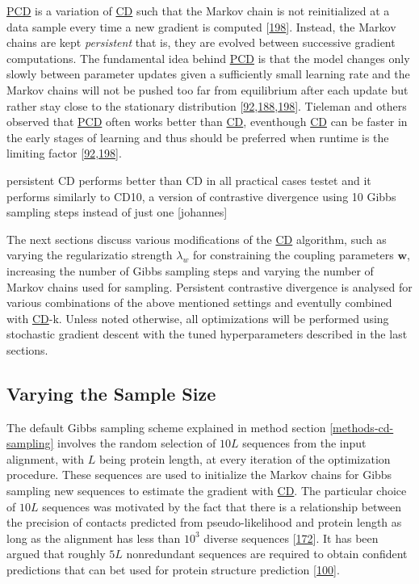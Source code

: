 \documentclass[11pt,a4paper,twoside]{book}
\newcommand{\w}{\mathbf{w}}
\theoremstyle{definition}
\theoremstyle{definition}
\theoremstyle{remark}
\begin{document}
\protect\hyperlink{abbrev}{PCD} is a variation of
\protect\hyperlink{abbrev}{CD} such that the Markov chain is not
reinitialized at a data sample every time a new gradient is computed
{[}\protect\hyperlink{ref-Tieleman2008}{198}{]}. Instead, the Markov
chains are kept \emph{persistent} that is, they are evolved between
successive gradient computations. The fundamental idea behind
\protect\hyperlink{abbrev}{PCD} is that the model changes only slowly
between parameter updates given a sufficiently small learning rate and
the Markov chains will not be pushed too far from equilibrium after each
update but rather stay close to the stationary distribution
{[}\protect\hyperlink{ref-Murphy2012}{92},\protect\hyperlink{ref-Fischer2012}{188},\protect\hyperlink{ref-Tieleman2008}{198}{]}.
Tieleman and others observed that \protect\hyperlink{abbrev}{PCD} often
works better than \protect\hyperlink{abbrev}{CD}, eventhough
\protect\hyperlink{abbrev}{CD} can be faster in the early stages of
learning and thus should be preferred when runtime is the limiting
factor
{[}\protect\hyperlink{ref-Murphy2012}{92},\protect\hyperlink{ref-Tieleman2008}{198}{]}.

persistent CD performs better than CD in all practical cases testet and
it performs similarly to CD10, a version of contrastive divergence using
10 Gibbs sampling steps instead of just one {[}johannes{]}

The next sections discuss various modifications of the
\protect\hyperlink{abbrev}{CD} algorithm, such as varying the
regularizatio strength \(\lambda_w\) for constraining the coupling
parameters \(\w\), increasing the number of Gibbs sampling steps and
varying the number of Markov chains used for sampling. Persistent
contrastive divergence is analysed for various combinations of the above
mentioned settings and eventully combined with
\protect\hyperlink{abbrev}{CD}-k. Unless noted otherwise, all
optimizations will be performed using stochastic gradient descent with
the tuned hyperparameters described in the last sections.

\subsection{Varying the Sample Size}\label{cd-sampling-size}

The default Gibbs sampling scheme explained in method section
\ref{methods-cd-sampling} involves the random selection of \(10L\)
sequences from the input alignment, with \(L\) being protein length, at
every iteration of the optimization procedure. These sequences are used
to initialize the Markov chains for Gibbs sampling new sequences to
estimate the gradient with \protect\hyperlink{abbrev}{CD}. The
particular choice of \(10L\) sequences was motivated by the fact that
there is a relationship between the precision of contacts predicted from
pseudo-likelihood and protein length as long as the alignment has less
than \(10^3\) diverse sequences
{[}\protect\hyperlink{ref-Anishchenko2017}{172}{]}. It has been argued
that roughly \(5L\) nonredundant sequences are required to obtain
confident predictions that can bet used for protein structure prediction
{[}\protect\hyperlink{ref-Kamisetty2013}{100}{]}.
\end{document}
